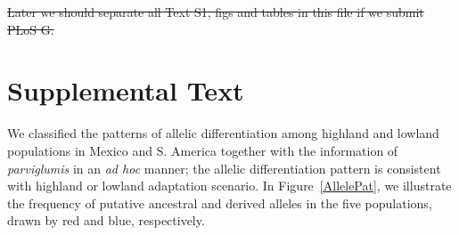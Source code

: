 %
%
%
%
%
%
%
%
%
%
%
%
%
%
%




\newpage
\st{Later we should separate all Text S1, figs and tables in this file if we submit PLoS G.}

\section*{Supplemental Text} \label{sec:supptextsho}


We classified the patterns of allelic differentiation among highland and lowland populations in Mexico and S. America together with the information of \emph{parviglumis} in an \emph{ad hoc} manner; the allelic differentiation pattern is consistent with highland or lowland adaptation scenario.  
In Figure~\ref{AllelePat}, we illustrate the frequency of putative ancestral and derived alleles in the five populations, drawn by red and blue, respectively.

